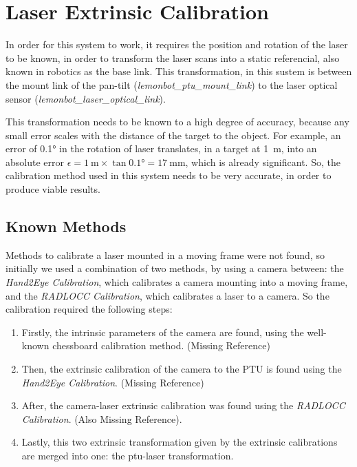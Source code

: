 \chapter{Laser Extrinsic Calibration}

In order for this system to work, it requires the position and rotation of the laser to be known, in order to transform the laser scans into a static referencial, also known in robotics as the base link. This transformation, in this sustem is between the mount link of the pan-tilt (\textit{lemonbot\_ptu\_mount\_link}) to the laser optical sensor (\textit{lemonbot\_laser\_optical\_link}).

This transformation needs to be known to a high degree of accuracy, because any small error scales with the distance of the target to the object. For example, an error of \ang{0.1} in the rotation of laser translates, in a target at \SI{1}{\meter}, into an absolute error $\epsilon = \SI{1}{\meter} \times \tan{\ang{0.1}} = \SI{17}{\milli\meter}$, which is already significant. So, the calibration method used in this system needs to be very accurate, in order to produce viable results.

\section{Known Methods}

Methods to calibrate a laser mounted in a moving frame were not found, so initially we used a combination of two methods, by using a camera between: the \textit{Hand2Eye Calibration}, which calibrates a camera mounting into a moving frame, and the \textit{RADLOCC Calibration}, which calibrates a laser to a camera. So the calibration required the following steps:

\begin{enumerate}
    \item Firstly, the intrinsic parameters of the camera are found, using the well-known chessboard calibration method. (Missing Reference)
    \item Then, the extrinsic calibration of the camera to the PTU is found using the \textit{Hand2Eye Calibration}. (Missing Reference)
    \item After, the camera-laser extrinsic calibration was found using the \textit{RADLOCC Calibration}. (Also Missing Reference).
    \item Lastly, this two extrinsic transformation given by the extrinsic calibrations are merged into one: the ptu-laser transformation.
\end{enumerate}


